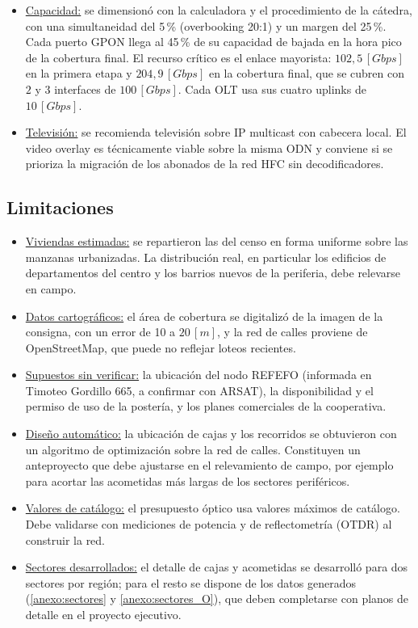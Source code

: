 \begin{itemize}
    \item \underline{Capacidad:} se dimensionó con la calculadora y el procedimiento de la cátedra, con una simultaneidad del 5\,\% (overbooking 20:1) y un margen del 25\,\%. Cada puerto GPON llega al 45\,\% de su capacidad de bajada en la hora pico de la cobertura final. El recurso crítico es el enlace mayorista: $102{,}5 \, [Gbps]$ en la primera etapa y $204{,}9 \, [Gbps]$ en la cobertura final, que se cubren con $2$ y $3$ interfaces de $100 \, [Gbps]$. Cada OLT usa sus cuatro uplinks de $10 \, [Gbps]$.
    \item \underline{Televisión:} se recomienda televisión sobre IP multicast con cabecera local. El video overlay es técnicamente viable sobre la misma ODN y conviene si se prioriza la migración de los abonados de la red HFC sin decodificadores.
\end{itemize}

\subsection{Limitaciones}
\begin{itemize}
    \item \underline{Viviendas estimadas:} se repartieron las del censo en forma uniforme sobre las manzanas urbanizadas. La distribución real, en particular los edificios de departamentos del centro y los barrios nuevos de la periferia, debe relevarse en campo.
    \item \underline{Datos cartográficos:} el área de cobertura se digitalizó de la imagen de la consigna, con un error de 10 a $20 \, [m]$, y la red de calles proviene de OpenStreetMap, que puede no reflejar loteos recientes.
    \item \underline{Supuestos sin verificar:} la ubicación del nodo REFEFO (informada en Timoteo Gordillo 665, a confirmar con ARSAT), la disponibilidad y el permiso de uso de la postería, y los planes comerciales de la cooperativa.
    \item \underline{Diseño automático:} la ubicación de cajas y los recorridos se obtuvieron con un algoritmo de optimización sobre la red de calles. Constituyen un anteproyecto que debe ajustarse en el relevamiento de campo, por ejemplo para acortar las acometidas más largas de los sectores periféricos.
    \item \underline{Valores de catálogo:} el presupuesto óptico usa valores máximos de catálogo. Debe validarse con mediciones de potencia y de reflectometría (OTDR) al construir la red.
    \item \underline{Sectores desarrollados:} el detalle de cajas y acometidas se desarrolló para dos sectores por región; para el resto se dispone de los datos generados (\autoref{anexo:sectores} y \autoref{anexo:sectores_O}), que deben completarse con planos de detalle en el proyecto ejecutivo.
\end{itemize}
